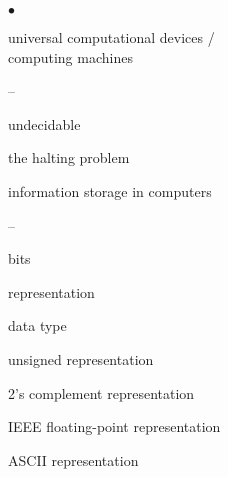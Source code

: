 \begin{minipage}[t]{3.0in}
\begin{list}{$\bullet$}{\setlength{\itemsep}{0pt}\setlength{\parskip}{0pt}%
\setlength{\topsep}{0pt}\setlength{\partopsep}{0pt}\setlength{\parsep}{0pt}}

\item{universal computational devices / \\ computing machines %
\begin{list}{--}{\setlength{\itemsep}{0pt}\setlength{\parskip}{0pt}%
\setlength{\topsep}{0pt}\setlength{\partopsep}{0pt}\setlength{\parsep}{0pt}}
\item undecidable %
\item the halting problem %
\end{list}
}

%

\item{information storage in computers
\begin{list}{--}{\setlength{\itemsep}{0pt}\setlength{\parskip}{0pt}%
\setlength{\topsep}{0pt}\setlength{\partopsep}{0pt}\setlength{\parsep}{0pt}}
\item bits %
\item representation %
\item data type %
\item unsigned representation %
\item 2's complement representation
%
%
\item IEEE floating-point representation
\item ASCII representation
\end{list}
}


\end{list}
\end{minipage}
